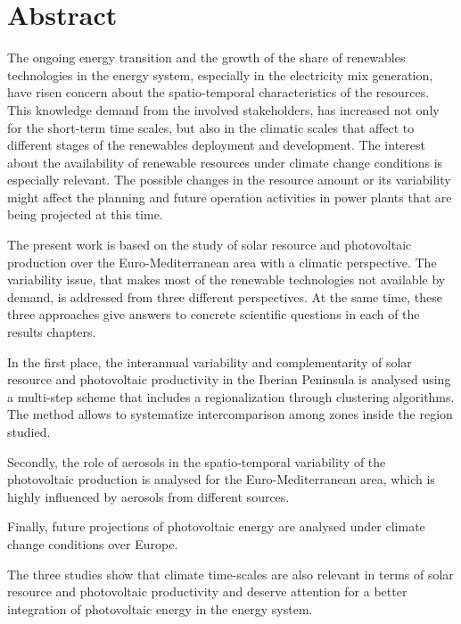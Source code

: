 \chapter*{Abstract\label{cha:abstract}}
  The ongoing energy transition and the growth of the share of renewables technologies in the energy system, especially in the electricity mix generation, have risen concern about the spatio-temporal characteristics of the resources. This knowledge demand from the involved stakeholders, has increased not only for the short-term time scales, but also in the climatic scales that affect to different stages of the renewables deployment and development. The interest about the availability of renewable resources under climate change conditions is especially relevant. The possible changes in the resource amount or its variability might affect the planning and future operation activities in power plants that are being projected at this time. 

The present work is based on the study of solar resource and photovoltaic production over the Euro-Mediterranean area with a climatic perspective. The variability issue, that makes most of the renewable technologies not available by demand, is addressed from three different perspectives. At the same time, these three approaches give answers to concrete scientific questions in each of the results chapters.

In the first place, the interannual variability and complementarity of solar resource and photovoltaic productivity in the Iberian Peninsula is analysed using a multi-step scheme that includes a regionalization through clustering algorithms. The method allows to systematize intercomparison among zones inside the region studied.

Secondly, the role of aerosols in the spatio-temporal variability of the photovoltaic production is analysed for the Euro-Mediterranean area, which is highly influenced by aerosols from different sources.

Finally, future projections of photovoltaic energy are analysed under climate change conditions over Europe.

The three studies show that climate time-scales are also relevant in terms of solar resource and photovoltaic productivity and deserve attention for a better integration of photovoltaic energy in the energy system.


